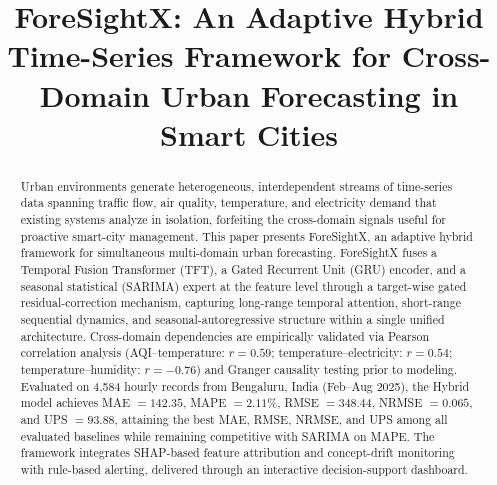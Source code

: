 \documentclass[conference]{IEEEtran}
\begin{document}
\title{ForeSightX: An Adaptive Hybrid Time-Series Framework for Cross-Domain Urban Forecasting in Smart Cities}

\author{
}

\maketitle

\begin{abstract}
Urban environments generate heterogeneous, interdependent streams of time-series data spanning traffic flow, air quality, temperature, and electricity demand that existing systems analyze in isolation, forfeiting the cross-domain signals useful for proactive smart-city management. This paper presents ForeSightX, an adaptive hybrid framework for simultaneous multi-domain urban forecasting. ForeSightX fuses a Temporal Fusion Transformer (TFT), a Gated Recurrent Unit (GRU) encoder, and a seasonal statistical (SARIMA) expert at the feature level through a target-wise gated residual-correction mechanism, capturing long-range temporal attention, short-range sequential dynamics, and seasonal-autoregressive structure within a single unified architecture. Cross-domain dependencies are empirically validated via Pearson correlation analysis (AQI--temperature: $r{=}0.59$; temperature--electricity: $r{=}0.54$; temperature--humidity: $r{=}-0.76$) and Granger causality testing prior to modeling. Evaluated on 4{,}584 hourly records from Bengaluru, India (Feb--Aug 2025), the Hybrid model achieves MAE $=142.35$, MAPE $=2.11\%$, RMSE $=348.44$, NRMSE $=0.065$, and UPS $=93.88$, attaining the best MAE, RMSE, NRMSE, and UPS among all evaluated baselines while remaining competitive with SARIMA on MAPE. The framework integrates SHAP-based feature attribution and concept-drift monitoring with rule-based alerting, delivered through an interactive decision-support dashboard.
\end{abstract}
\end{document}
